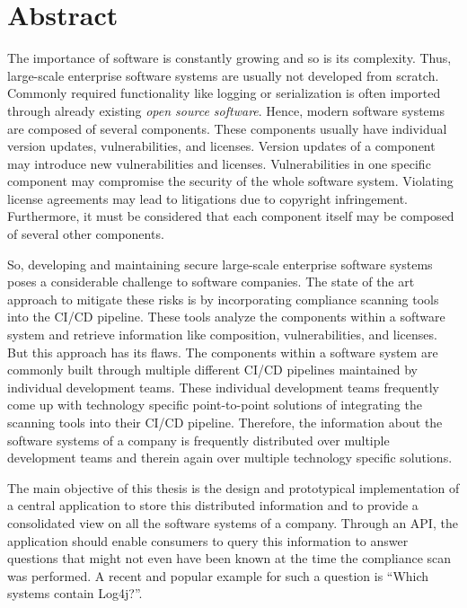 
\titlespacing*{\chapter}{0pt}{0pt}{40pt}
\pagestyle{plain}
\chapter*{Abstract}
The importance of software is constantly growing and so is its complexity. Thus, large-scale enterprise software systems are usually not developed from scratch. Commonly required functionality like logging or serialization is often imported through already existing \emph{open source software}. Hence, modern software systems are composed of several components. These components usually have individual version updates, vulnerabilities, and licenses. Version updates of a component may introduce new vulnerabilities and licenses. Vulnerabilities in one specific component may compromise the security of the whole software system. Violating license agreements may lead to litigations due to copyright infringement. Furthermore, it must be considered that each component itself may be composed of several other components.\par
So, developing and maintaining secure large-scale enterprise software systems poses a considerable challenge to software companies. The state of the art approach to mitigate these risks is by incorporating compliance scanning tools into the CI/CD pipeline. These tools analyze the components within a software system and retrieve information like composition, vulnerabilities, and licenses. But this approach has its flaws. The components within a software system are commonly built through multiple different CI/CD pipelines maintained by individual development teams. These individual development teams frequently come up with technology specific point-to-point solutions of integrating the scanning tools into their CI/CD pipeline. Therefore, the information about the software systems of a company is frequently distributed over multiple development teams and therein again over multiple technology specific solutions.\par
The main objective of this thesis is the design and prototypical implementation of a central application to store this distributed information and to provide a consolidated view on all the software systems of a company. Through an API, the application should enable consumers to query this information to answer questions that might not even have been known at the time the compliance scan was performed. A recent and popular example for such a question is \enquote{Which systems contain Log4j?}.\par

\vfill
\titlespacing*{\chapter}{0pt}{50pt}{40pt}